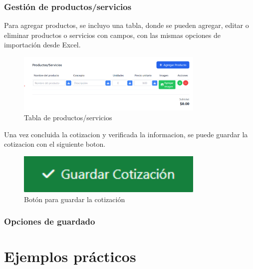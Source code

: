 \documentclass{Pretexto/bluereport}
\begin{document}
\subsubsection{Gestión de productos/servicios}

Para agregar productos, se incluyo una tabla, donde se pueden agregar, editar o eliminar productos o servicios con campos, con las mismas opciones de importación desde Excel.

\begin{figure}[H]
    \centering
    \includegraphics[width=0.8\textwidth]{img/tabla_productos.png}
    \caption{Tabla de productos/servicios}
    \label{fig:tabla_productos} 
\end{figure}

Una vez concluida la cotizacion y verificada la informacion, se puede guardar la cotizacion con el siguiente boton.

\begin{figure}[H]
    \centering
    \includegraphics[width=0.8\textwidth]{img/boton_guardar.png}
    \caption{Botón para guardar la cotización}
    \label{fig:boton_guardar}
\end{figure}

\subsubsection{Opciones de guardado}

\section{Ejemplos prácticos}
\end{document}
